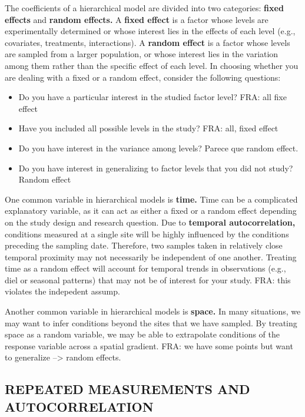 \documentclass[]{article}
\begin{document}
The coefficients of a hierarchical model are divided into two
categories: \textbf{fixed effects} and \textbf{random effects.} A
\textbf{fixed effect} is a factor whose levels are experimentally
determined or whose interest lies in the effects of each level (e.g.,
covariates, treatments, interactions). A \textbf{random effect} is a
factor whose levels are sampled from a larger population, or whose
interest lies in the variation among them rather than the specific
effect of each level. In choosing whether you are dealing with a fixed
or a random effect, consider the following questions:

\begin{itemize}
\item
  Do you have a particular interest in the studied factor level? FRA:
  all fixe effect
\item
  Have you included all possible levels in the study? FRA: all, fixed
  effect
\item
  Do you have interest in the variance among levels? Parece que random
  effect.
\item
  Do you have interest in generalizing to factor levels that you did not
  study? Random effect
\end{itemize}

One common variable in hierarchical models is \textbf{time.} Time can be
a complicated explanatory variable, as it can act as either a fixed or a
random effect depending on the study design and research question. Due
to \textbf{temporal autocorrelation,} conditions measured at a single
site will be highly influenced by the conditions preceding the sampling
date. Therefore, two samples taken in relatively close temporal
proximity may not necessarily be independent of one another. Treating
time as a random effect will account for temporal trends in observations
(e.g., diel or seasonal patterns) that may not be of interest for your
study. FRA: this violates the indepedent assump.

Another common variable in hierarchical models is \textbf{space.} In
many situations, we may want to infer conditions beyond the sites that
we have sampled. By treating space as a random variable, we may be able
to extrapolate conditions of the response variable across a spatial
gradient. FRA: we have some points but want to generalize
--\textgreater{} random effects.

\subsection{REPEATED MEASUREMENTS AND
AUTOCORRELATION}\label{repeated-measurements-and-autocorrelation}
\end{document}

